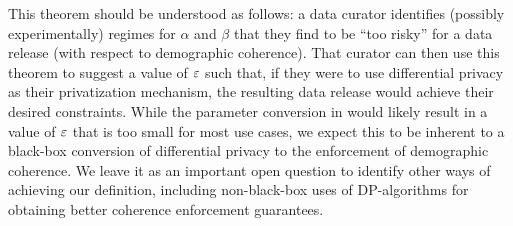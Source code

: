 This theorem should be understood as follows: a data curator identifies (possibly experimentally) regimes for $\alpha$ and $
\beta$ that they find to be ``too risky''
for a data release (with respect to demographic coherence).  That curator can then use this 
theorem to suggest a value of $\varepsilon$ such that, if they were to use differential privacy as their privatization mechanism, the resulting data release would achieve their desired constraints. While the parameter conversion in  would likely result in a value of $\varepsilon$ that is too small for most use cases, we expect this to be inherent to a black-box conversion of differential privacy to the enforcement of demographic coherence. 
We leave it as an important open question 
to identify other ways of achieving our definition, including non-black-box uses of DP-algorithms for obtaining better coherence enforcement guarantees.